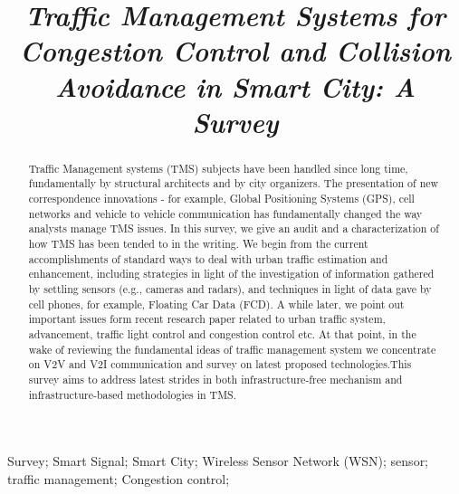 \documentclass[conference]{IEEEtran}
\begin{document}
\title{\textit{Traffic Management Systems for Congestion Control and Collision Avoidance
in Smart City: A Survey}}

\author{
\and
{}
}

\maketitle

\begin{abstract}
Traffic Management systems (TMS) subjects have been handled since long time, fundamentally by structural architects and by city organizers. The presentation of new correspondence innovations - for example, Global Positioning Systems (GPS), cell networks and vehicle to vehicle communication has fundamentally changed the way analysts manage TMS issues. In this survey, we give an audit and a characterization of how TMS has been tended to in the writing. We begin from the current accomplishments of standard ways to deal with urban traffic estimation and enhancement, including strategies in light of the investigation of information gathered by settling sensors (e.g., cameras and radars), and techniques in light of data gave by cell phones, for example, Floating Car Data (FCD). A while later, we point out important issues form recent research paper related to urban traffic system, advancement, traffic light control and congestion control etc. At that point, in the wake of reviewing the fundamental ideas of traffic management system we concentrate on V2V and V2I communication and survey on latest proposed technologies.This survey aims to address latest strides in both infrastructure-free mechanism and infrastructure-based methodologies in TMS. 
\end{abstract}

\begin{IEEEkeywords}
Survey; Smart Signal; Smart City; Wireless Sensor Network (WSN); sensor; traffic management; Congestion control;
\end{IEEEkeywords}

\IEEEpeerreviewmaketitle
\end{document}
